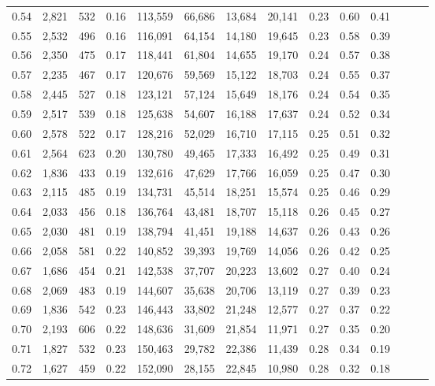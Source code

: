 \begin{tabular}{rrrrrrrrrrrrrr}
0.54 &  2,821 &  532 &  0.16 &  113,559 &   66,686 &  13,684 &  20,141 &  0.23 &  0.60 &      0.41 \\
0.55 &  2,532 &  496 &  0.16 &  116,091 &   64,154 &  14,180 &  19,645 &  0.23 &  0.58 &      0.39 \\
0.56 &  2,350 &  475 &  0.17 &  118,441 &   61,804 &  14,655 &  19,170 &  0.24 &  0.57 &      0.38 \\
0.57 &  2,235 &  467 &  0.17 &  120,676 &   59,569 &  15,122 &  18,703 &  0.24 &  0.55 &      0.37 \\
0.58 &  2,445 &  527 &  0.18 &  123,121 &   57,124 &  15,649 &  18,176 &  0.24 &  0.54 &      0.35 \\
0.59 &  2,517 &  539 &  0.18 &  125,638 &   54,607 &  16,188 &  17,637 &  0.24 &  0.52 &      0.34 \\
0.60 &  2,578 &  522 &  0.17 &  128,216 &   52,029 &  16,710 &  17,115 &  0.25 &  0.51 &      0.32 \\
0.61 &  2,564 &  623 &  0.20 &  130,780 &   49,465 &  17,333 &  16,492 &  0.25 &  0.49 &      0.31 \\
0.62 &  1,836 &  433 &  0.19 &  132,616 &   47,629 &  17,766 &  16,059 &  0.25 &  0.47 &      0.30 \\
0.63 &  2,115 &  485 &  0.19 &  134,731 &   45,514 &  18,251 &  15,574 &  0.25 &  0.46 &      0.29 \\
0.64 &  2,033 &  456 &  0.18 &  136,764 &   43,481 &  18,707 &  15,118 &  0.26 &  0.45 &      0.27 \\
0.65 &  2,030 &  481 &  0.19 &  138,794 &   41,451 &  19,188 &  14,637 &  0.26 &  0.43 &      0.26 \\
0.66 &  2,058 &  581 &  0.22 &  140,852 &   39,393 &  19,769 &  14,056 &  0.26 &  0.42 &      0.25 \\
0.67 &  1,686 &  454 &  0.21 &  142,538 &   37,707 &  20,223 &  13,602 &  0.27 &  0.40 &      0.24 \\
0.68 &  2,069 &  483 &  0.19 &  144,607 &   35,638 &  20,706 &  13,119 &  0.27 &  0.39 &      0.23 \\
0.69 &  1,836 &  542 &  0.23 &  146,443 &   33,802 &  21,248 &  12,577 &  0.27 &  0.37 &      0.22 \\
0.70 &  2,193 &  606 &  0.22 &  148,636 &   31,609 &  21,854 &  11,971 &  0.27 &  0.35 &      0.20 \\
0.71 &  1,827 &  532 &  0.23 &  150,463 &   29,782 &  22,386 &  11,439 &  0.28 &  0.34 &      0.19 \\
0.72 &  1,627 &  459 &  0.22 &  152,090 &   28,155 &  22,845 &  10,980 &  0.28 &  0.32 &      0.18 \\

\end{tabular}
